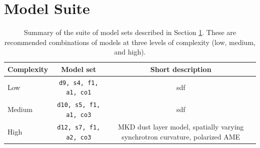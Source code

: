 \documentclass[twocolumn]{aastex631}
\begin{document}


\section{Model Suite}\label{sec:modelsuite}

\begin{table}[]
    \centering
    \begin{tabular}{lcc}
    
    \toprule 
    Complexity & Model set & Short description \\
    \midrule
    Low  & \texttt{d9, s4, f1, a1, co1} & sdf  \\
    Medium  & \texttt{d10, s5, f1, a1, co3} & sdf   \\
    High  & \texttt{d12, s7, f1, a2, co3} & MKD dust layer model, spatially varying synchrotron curvature, polarized AME  \\
   
   \bottomrule
    \end{tabular}
    \caption{Summary of the suite of model sets described in Section \ref{sec:modelsuite}. These are recommended combinations of models at three levels of complexity (low, medium, and high).  }
    \label{tab:modelsuite}
\end{table}
\end{document}
